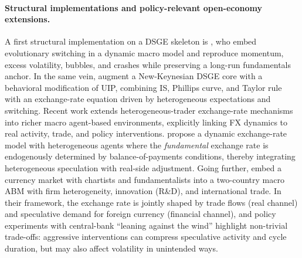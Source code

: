 \documentclass[a4paper,10pt,final]{article}    %
\begin{document}
\paragraph{Structural implementations and policy-relevant open-economy extensions.}
A first structural implementation on a DSGE skeleton is \citet{DeGrauwe2006}, who embed evolutionary switching in a dynamic macro model and reproduce momentum, excess volatility, bubbles, and crashes while preserving a long-run fundamentals anchor. In the same vein, \citet{Proano2011,proano2013monetary} augment a New-Keynesian DSGE core with a behavioral modification of UIP, combining IS, Phillips curve, and Taylor rule with an exchange-rate equation driven by heterogeneous expectations and switching.
Recent work extends heterogeneous-trader exchange-rate mechanisms into richer macro agent-based environments, explicitly linking FX dynamics to real activity, trade, and policy interventions. \citet{gori2018dynamic} propose a dynamic exchange-rate model with heterogeneous agents where the \emph{fundamental} exchange rate is endogenously determined by balance-of-payments conditions, thereby integrating heterogeneous speculation with real-side adjustment. Going further, \citet{delli2024complex} embed a currency market with chartists and fundamentalists into a two-country macro ABM with firm heterogeneity, innovation (R\&D), and international trade. In their framework, the exchange rate is jointly shaped by trade flows (real channel) and speculative demand for foreign currency (financial channel), and policy experiments with central-bank ``leaning against the wind'' highlight non-trivial trade-offs: aggressive interventions can compress speculative activity and cycle duration, but may also affect volatility in unintended ways.
\end{document}
